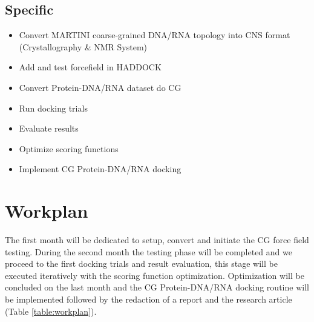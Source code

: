 \documentclass[
	12pt,				%
	openright,			%
	twoside,			%
	a4paper,			%
	english,			%
	french,				%
	spanish,			%
	brazil,				%
	]{abntex2}
\begin{document}
\section{Specific}

\begin{itemize}
	\item Convert MARTINI coarse-grained DNA/RNA topology into CNS format (Crystallography \& NMR System)
	\item Add and test forcefield in HADDOCK
	\item Convert Protein-DNA/RNA dataset do CG
	\item Run docking trials
	\item Evaluate results
	\item Optimize scoring functions
	\item Implement CG Protein-DNA/RNA docking
\end{itemize}

\chapter{Workplan}

The first month will be dedicated to setup, convert and initiate the CG force field testing. During the second month the testing phase will be completed and we proceed to the first docking trials and result evaluation, this stage will be executed iteratively with the scoring function optimization. Optimization will be concluded on the last month and the CG Protein-DNA/RNA docking routine will be implemented followed by the redaction of a report and the research article (Table \ref{table:workplan}).
\\
\\
\\
\end{document}
